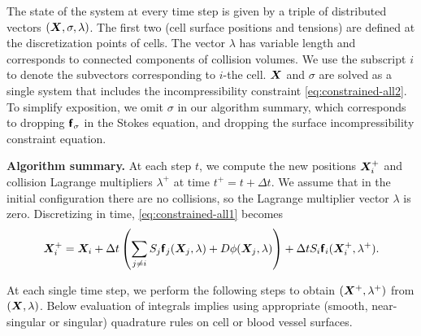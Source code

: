 The state of the system at every time step is given by a triple of distributed
vectors $({\bm{X}},\sigma, \lambda)$. The first two (cell surface positions and tensions)
are defined at the discretization points of cells. The vector $\lambda$ has variable
length and corresponds to connected components of collision volumes. 
We use the subscript $i$ to denote the subvectors corresponding to $i$-the cell.
${\bm{X}}$ and $\sigma$ are solved as a single system that includes the incompressibility
constraint \cref{eq:constrained-all2}.
To simplify exposition, we omit $\sigma$ in our algorithm summary,  which corresponds to
dropping $\bm{\mathsf{f}}_\sigma$  in the Stokes equation, and dropping the surface incompressibility
constraint equation. 

\textbf{Algorithm summary. }
At each step $t$, we compute the new positions ${\bm{X}}^+_i$ and collision Lagrange multipliers
$\lambda^+$ at time $t^+=t+\Delta t$.  We assume that in the initial configuration there are no collisions,
so the Lagrange multiplier vector $\lambda$ is zero.  Discretizing in
time,
\cref{eq:constrained-all1} becomes
%
\[ {\bm{X}}^+_i =  {\bm{X}}_i + \Delta t\left(\sum_{j\neq i} S_j
\bm{\mathsf{f}}_j({\bm{X}}_j,\lambda)  + D \phi({\bm{X}}_j, \lambda)\right) +  \Delta t S_i \bm{\mathsf{f}}_i({\bm{X}}^+_i, \lambda^+).
\]


At each single time step, we perform the following steps to obtain $({\bm{X}}^+, \lambda^+)$ from $({\bm{X}}, \lambda)$. Below evaluation of integrals implies using appropriate (smooth, near-singular or singular) quadrature rules on cell or blood vessel surfaces. 

